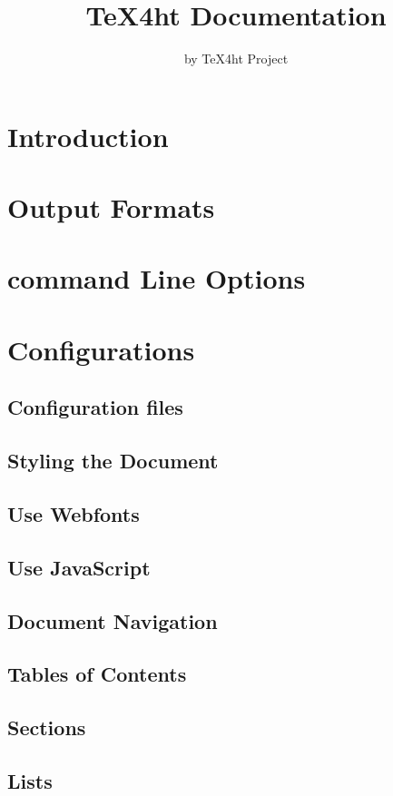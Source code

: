 \documentclass{book}
\title{TeX4ht Documentation}
\author{by TeX4ht Project}
\begin{document}
\maketitle

\tableofcontents

\chapter{Introduction}

\chapter{Output Formats}
\chapter{command Line Options}


\chapter{Configurations}
\section{Configuration files}
\section{Styling the Document}
\section{Use Webfonts}
\section{Use JavaScript}
\section{Document Navigation}
\section{Tables of Contents}

\section{Sections}
\section{Lists}
\end{document}
